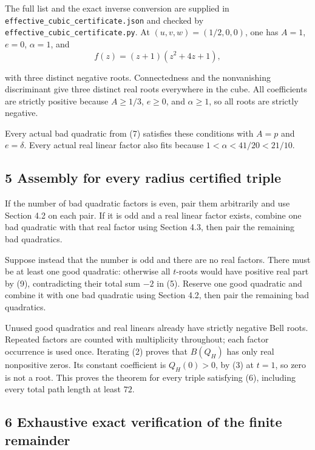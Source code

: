 \documentclass[
  11pt,
  a4paper,
]{article}
\begin{document}
The full list and the exact inverse conversion are supplied in
\texttt{\nolinkurl{effective_cubic_certificate.json}} and checked by
\texttt{\nolinkurl{effective_cubic_certificate.py}}. At
\((u,v,w)=(1/2,0,0)\), one has \(A=1\), \(e=0\), \(\alpha=1\), and
\nopagebreak
\[
f(z)=(z+1)(z^2+4z+1),
\]

with three distinct negative roots. Connectedness and the nonvanishing
discriminant give three distinct real roots everywhere in the cube. All
coefficients are strictly positive because \(A\geq1/3\), \(e\geq0\), and
\(\alpha\geq1\), so all roots are strictly negative.

Every actual bad quadratic from (7) satisfies these conditions with
\(A=p\) and \(e=\delta\). Every actual real linear factor also fits
because \(1<\alpha<41/20<21/10\).

\subsection{5 Assembly for every radius certified
triple}\label{assembly-for-every-radius-certified-triple}

If the number of bad quadratic factors is even, pair them arbitrarily
and use Section 4.2 on each pair. If it is odd and a real linear factor
exists, combine one bad quadratic with that real factor using Section
4.3, then pair the remaining bad quadratics.

Suppose instead that the number is odd and there are no real factors.
There must be at least one good quadratic: otherwise all \(t\)-roots
would have positive real part by (9), contradicting their total sum
\(-2\) in (5). Reserve one good quadratic and combine it with one bad
quadratic using Section 4.2, then pair the remaining bad quadratics.

Unused good quadratics and real linears already have strictly negative
Bell roots. Repeated factors are counted with multiplicity throughout;
each factor occurrence is used once. Iterating (2) proves that
\(B(Q_H)\) has only real nonpositive zeros. Its constant coefficient is
\(Q_H(0)>0\), by (3) at \(t=1\), so zero is not a root. This proves the
theorem for every triple satisfying (6), including every total path
length at least \(72\).

\subsection{6 Exhaustive exact verification of the finite
remainder}\label{exhaustive-exact-verification-of-the-finite-remainder}
\end{document}
